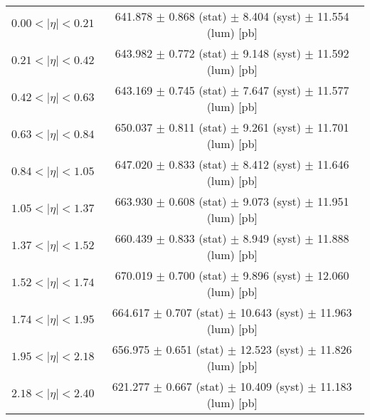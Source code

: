 \begin{tabular}{lc}
\hline
$0.00 < |\eta| <0.21$          & 641.878 $\pm$ 0.868 (stat) $\pm$ 8.404 (syst) $\pm$ 11.554 (lum) [pb]  \\
$0.21 < |\eta| <0.42$          & 643.982 $\pm$ 0.772 (stat) $\pm$ 9.148 (syst) $\pm$ 11.592 (lum) [pb]  \\
$0.42 < |\eta| <0.63$          & 643.169 $\pm$ 0.745 (stat) $\pm$ 7.647 (syst) $\pm$ 11.577 (lum) [pb]  \\
$0.63 < |\eta| <0.84$          & 650.037 $\pm$ 0.811 (stat) $\pm$ 9.261 (syst) $\pm$ 11.701 (lum) [pb]  \\
$0.84 < |\eta| <1.05$          & 647.020 $\pm$ 0.833 (stat) $\pm$ 8.412 (syst) $\pm$ 11.646 (lum) [pb]  \\
$1.05 < |\eta| <1.37$          & 663.930 $\pm$ 0.608 (stat) $\pm$ 9.073 (syst) $\pm$ 11.951 (lum) [pb]  \\
$1.37 < |\eta| <1.52$          & 660.439 $\pm$ 0.833 (stat) $\pm$ 8.949 (syst) $\pm$ 11.888 (lum) [pb]  \\
$1.52 < |\eta| <1.74$          & 670.019 $\pm$ 0.700 (stat) $\pm$ 9.896 (syst) $\pm$ 12.060 (lum) [pb]  \\
$1.74 < |\eta| <1.95$          & 664.617 $\pm$ 0.707 (stat) $\pm$ 10.643 (syst) $\pm$ 11.963 (lum) [pb]  \\
$1.95 < |\eta| <2.18$          & 656.975 $\pm$ 0.651 (stat) $\pm$ 12.523 (syst) $\pm$ 11.826 (lum) [pb]  \\
$2.18 < |\eta| <2.40$          & 621.277 $\pm$ 0.667 (stat) $\pm$ 10.409 (syst) $\pm$ 11.183 (lum) [pb]  \\
\hline
\end{tabular}
